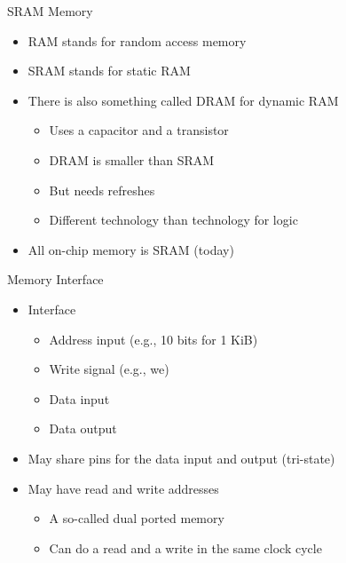 \begin{frame}[fragile]{SRAM Memory}
\begin{itemize}
\item RAM stands for random access memory
\item SRAM stands for static RAM
\item There is also something called DRAM for dynamic RAM
\begin{itemize}
\item Uses a capacitor and a transistor
\item DRAM is smaller than SRAM
\item But needs refreshes
\item Different technology than technology for logic
\end{itemize}
\item All on-chip memory is SRAM (today)
\end{itemize}
\end{frame}

\begin{frame}[fragile]{Memory Interface}
\begin{itemize}
\item Interface
\begin{itemize}
\item Address input (e.g., 10 bits for 1 KiB)
\item Write signal (e.g., we)
\item Data input
\item Data output
\end{itemize}
\item May share pins for the data input and output (tri-state)
\item May have read and write addresses
\begin{itemize}
\item A so-called dual ported memory
\item Can do a read and a write in the same clock cycle
\end{itemize}
\end{itemize}
\end{frame}


